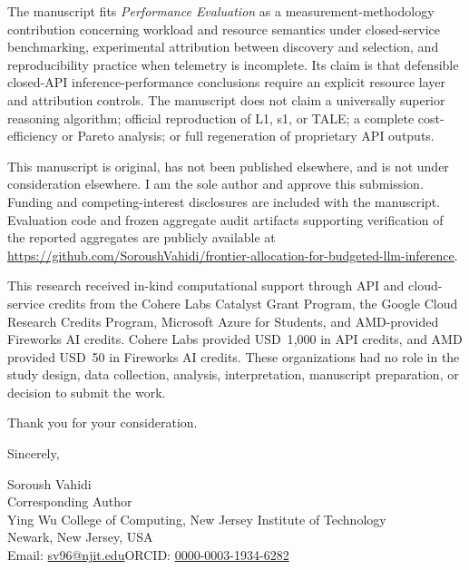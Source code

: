 \documentclass[10pt]{article}
\begin{document}
The manuscript fits \textit{Performance Evaluation} as a measurement-methodology contribution concerning workload and resource semantics under closed-service benchmarking, experimental attribution between discovery and selection, and reproducibility practice when telemetry is incomplete. Its claim is that defensible closed-API inference-performance conclusions require an explicit resource layer and attribution controls. The manuscript does not claim a universally superior reasoning algorithm; official reproduction of L1, s1, or TALE; a complete cost-efficiency or Pareto analysis; or full regeneration of proprietary API outputs.

This manuscript is original, has not been published elsewhere, and is not under consideration elsewhere. I am the sole author and approve this submission. Funding and competing-interest disclosures are included with the manuscript. Evaluation code and frozen aggregate audit artifacts supporting verification of the reported aggregates are publicly available at \url{https://github.com/SoroushVahidi/frontier-allocation-for-budgeted-llm-inference}.

This research received in-kind computational support through API and cloud-service credits from the Cohere Labs Catalyst Grant Program, the Google Cloud Research Credits Program, Microsoft Azure for Students, and \mbox{AMD-provided} Fireworks AI credits. Cohere Labs provided USD~1{,}000 in API credits, and AMD provided USD~50 in Fireworks AI credits. These organizations had no role in the study design, data collection, analysis, interpretation, manuscript preparation, or decision to submit the work.

Thank you for your consideration.

\vspace{0.45em}
\noindent
Sincerely,

\vspace{0.65em}
\noindent
Soroush Vahidi\\
Corresponding Author\\
Ying Wu College of Computing, New Jersey Institute of Technology\\
Newark, New Jersey, USA\\
Email: \href{mailto:sv96@njit.edu}{sv96@njit.edu}\quad ORCID: \href{https://orcid.org/0000-0003-1934-6282}{0000-0003-1934-6282}
\end{document}
